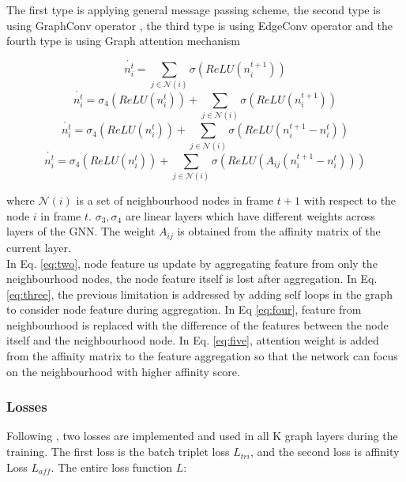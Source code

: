 \documentclass[10pt,twocolumn,letterpaper]{article}
\begin{document}
The first type is applying general message passing scheme, the second type is using GraphConv operator \cite{}, the third type is using EdgeConv operator \cite{} and the fourth type is using Graph attention mechanism \cite{}

\begin{equation}\label{eq:two}
\acute{n^{t}_{i}} = \sum_{j \in \mathcal{N}(i)} \sigma(ReLU(n^{t+1}_{i}))
\end{equation}
\begin{equation}\label{eq:three}
\acute{n^{t}_{i}} = \sigma_{4}(ReLU(n^{t}_{i})) +  \sum_{j \in \mathcal{N}(i)} \sigma(ReLU(n^{t+1}_{i}))
\end{equation}
\begin{equation}\label{eq:four}
\acute{n^{t}_{i}} = \sigma_{4}(ReLU(n^{t}_{i})) +  \sum_{j \in \mathcal{N}(i)} \sigma(ReLU(n^{t+1}_{i} - n^{t}_{i}))
\end{equation}
\begin{equation}\label{eq:five}
\acute{n^{t}_{i}} = \sigma_{4}(ReLU(n^{t}_{i})) +  \sum_{j \in \mathcal{N}(i)} \sigma(ReLU(A_{ij}(n^{t+1}_{i} - n^{t}_{i})))
\end{equation}

where $\mathcal{N}(i)$ is a set of neighbourhood nodes in frame $t+1$ with respect to the node $i$ in frame $t$. $\sigma_{3}, \sigma_{4}$ are linear layers which have different weights across layers of the GNN. The weight $A_{ij}$ is obtained from the affinity matrix of the current layer. \\
In Eq. \ref{eq:two}, node feature us update by aggregating feature from only the neighbourhood nodes, the node feature itself is lost after aggregation. In Eq. \ref{eq:three}, the previous limitation is addressed by adding self loops in the graph to consider node feature during aggregation. In Eq \ref{eq:four}, feature from neighbourhood is replaced with the difference of the features between the node itself and the neighbourhood node. In Eq. \ref{eq:five}, attention weight is added from the affinity matrix to the feature aggregation so that the network can focus on the neighbourhood with higher affinity score.

\subsubsection{Losses}
Following \cite{weng2020gnn3dmot}, two losses are implemented and used in all K graph layers during the training. The first loss is the batch triplet loss $L_{tri}$, and the second loss is affinity Loss $L_{aff}$. The entire loss function $L$: 
\end{document}
